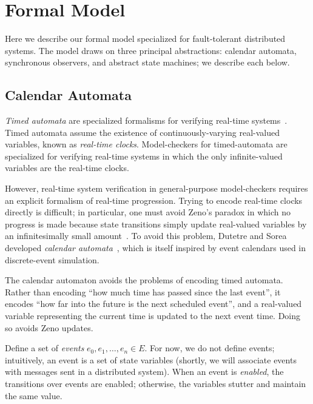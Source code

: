 \documentclass{llncs/llncs}
\begin{document}


\section{Formal Model}\label{sec:model}
Here we describe our formal model specialized for fault-tolerant distributed systems. The model draws on three principal abstractions: calendar automata, synchronous observers, and abstract state machines; we describe each below.

\subsection{Calendar Automata}\label{sec:calendar}
\emph{Timed automata} are specialized formalisms for verifying real-time systems~\cite{}. Timed automata assume the existence of continuously-varying real-valued variables, known as \emph{real-time clocks}. Model-checkers for timed-automata are specialized for verifying real-time systems in which the only infinite-valued variables are the real-time clocks.

However, real-time system verification in general-purpose model-checkers requires an explicit formalism of real-time progression. Trying to encode real-time clocks directly is difficult; in particular, one must avoid Zeno's paradox in which no progress is made because state transitions simply update real-valued variables by an infinitesimally small amount~\cite{bruno,lamport}. To avoid this problem, Dutetre and Sorea developed \emph{calendar automata}~\cite{bruno}, which is itself inspired by event calendars used in discrete-event simulation.

The calendar automaton avoids the problems of encoding timed automata. Rather than encoding ``how much time has passed since the last event'', it encodes ``how far into the future is the next scheduled event'', and a real-valued variable representing the current time is updated to the next event time. Doing so avoids Zeno updates.

Define a set of \emph{events} $e_0, e_1, \ldots, e_n \in E$. For now, we do not define events; intuitively, an event is a set of state variables (shortly, we will associate events with messages sent in a distributed system). When an event is \emph{enabled}, the transitions over events are enabled; otherwise, the variables stutter and maintain the same value.
\end{document}
